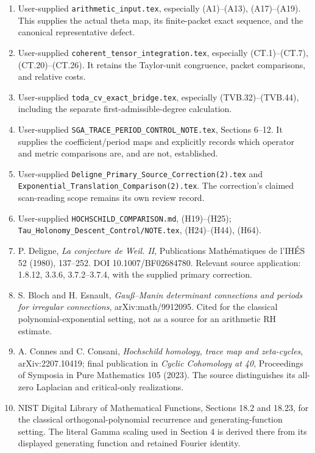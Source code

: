 \documentclass[
  11pt,
]{article}
\providecommand{\tightlist}{%
  \setlength{\itemsep}{0pt}\setlength{\parskip}{0pt}}
\begin{document}
\begin{enumerate}
\def\labelenumi{\arabic{enumi}.}
\tightlist
\item
  User-supplied \texttt{arithmetic\_input.tex}, especially (A1)--(A13),
  (A17)--(A19). This supplies the actual theta map, its finite-packet
  exact sequence, and the canonical representative defect.
\item
  User-supplied \texttt{coherent\_tensor\_integration.tex}, especially
  (CT.1)--(CT.7), (CT.20)--(CT.26). It retains the Taylor-unit
  congruence, packet comparisons, and relative costs.
\item
  User-supplied \texttt{toda\_cv\_exact\_bridge.tex}, especially
  (TVB.32)--(TVB.44), including the separate first-admissible-degree
  calculation.
\item
  User-supplied \texttt{SGA\_TRACE\_PERIOD\_CONTROL\_NOTE.tex}, Sections
  6--12. It supplies the coefficient/period maps and explicitly records
  which operator and metric comparisons are, and are not, established.
\item
  User-supplied \texttt{Deligne\_Primary\_Source\_Correction(2).tex} and
  \texttt{Exponential\_Translation\_Comparison(2).tex}. The correction's
  claimed scan-reading scope remains its own review record.
\item
  User-supplied \texttt{HOCHSCHILD\_COMPARISON.md}, (H19)--(H25);
  \texttt{Tau\_Holonomy\_Descent\_Control/NOTE.tex}, (H24)--(H44),
  (H64).
\item
  P. Deligne, \emph{La conjecture de Weil. II}, Publications
  Mathématiques de l'IHÉS 52 (1980), 137--252. DOI 10.1007/BF02684780.
  Relevant source application: 1.8.12, 3.3.6, 3.7.2--3.7.4, with the
  supplied primary correction.
\item
  S. Bloch and H. Esnault, \emph{Gauß--Manin determinant connections and
  periods for irregular connections}, arXiv:math/9912095. Cited for the
  classical polynomial-exponential setting, not as a source for an
  arithmetic RH estimate.
\item
  A. Connes and C. Consani, \emph{Hochschild homology, trace map and
  zeta-cycles}, arXiv:2207.10419; final publication in \emph{Cyclic
  Cohomology at 40}, Proceedings of Symposia in Pure Mathematics 105
  (2023). The source distinguishes its all-zero Laplacian and
  critical-only realizations.
\item
  NIST Digital Library of Mathematical Functions, Sections 18.2 and
  18.23, for the classical orthogonal-polynomial recurrence and
  generating-function setting. The literal Gamma scaling used in Section
  4 is derived there from its displayed generating function and retained
  Fourier identity.
\end{enumerate}
\end{document}
